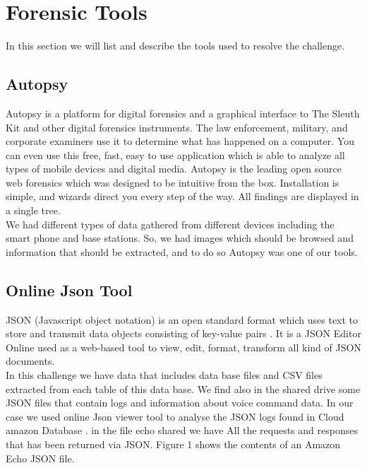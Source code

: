 \documentclass{easychair}
\begin{document}
\section{Forensic Tools}

\label{FA}In this section we will list and describe the tools used to resolve the challenge.


\subsection{Autopsy} Autopsy is a platform for digital forensics and a graphical interface to The Sleuth Kit and other digital forensics instruments. The law enforcement, military, and corporate examiners use it to determine what has happened on a computer. You can even use this free, fast, easy to use application which is able to analyze all types of mobile devices and digital media.  \cite{pari_1}\cite{pari_2}
\newline Autopsy is the leading open source web forensics which was designed to be intuitive from the box. Installation is simple, and wizards direct you every step of the way. All findings are displayed in a single tree. \cite{pari_3}
\\
We had different types of data gathered from different devices including the smart phone and base stations. So, we had images which should be browsed and information that should be extracted, and to do so Autopsy was one of our tools.

\subsection{Online Json Tool}
JSON (Javascript object notation) is an open standard format which uses text to store and transmit data objects consisting of key-value pairs \cite{Mery_1}.  It is a JSON Editor Online used as a web-based tool to view, edit, format, transform all kind of JSON documents. \\
In this challenge we have data that includes data base files and CSV files extracted from each table of this data base. We find also in the shared drive some JSON files that contain logs and information about voice command data. In our case we used online Json viewer \cite{Mery_2} tool to analyse the JSON logs found in Cloud amazon Database \cite{Mery_3}. in the file echo shared we have All the requests and responses that has been returned via JSON. Figure 1 shows the contents of an Amazon Echo JSON file.
\end{document}
